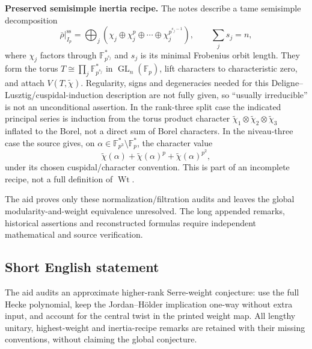 \documentclass[11pt]{article}
\newcommand{\F}{\mathbb{F}}
\begin{document}
\textbf{Preserved semisimple inertia recipe.} The notes describe a tame semisimple decomposition
\[
 \bar\rho|_{I_p}^{\mathrm{ss}}=
 \bigoplus_j(\chi_j\oplus\chi_j^p\oplus\cdots\oplus\chi_j^{p^{s_j-1}}),
 \qquad\sum_js_j=n,
\]
where \(\chi_j\) factors through \(\F_{p^{s_j}}^*\) and \(s_j\) is its minimal Frobenius orbit length. They form the torus \(T\cong\prod_j\F_{p^{s_j}}^*\) in \(\operatorname{GL}_n(\F_p)\), lift characters to characteristic zero, and attach \(V(T,\widetilde\chi)\). Regularity, signs and degeneracies needed for this Deligne--Lusztig/cuspidal-induction description are not fully given, so ``usually irreducible'' is not an unconditional assertion. In the rank-three split case the indicated principal series is induction from the torus product character \(\widetilde\chi_1\otimes\widetilde\chi_2\otimes\widetilde\chi_3\) inflated to the Borel, not a direct sum of Borel characters. In the niveau-three case the source gives, on \(\alpha\in\F_{p^3}^*\setminus\F_p^*\), the character value
\[
 \widetilde\chi(\alpha)+\widetilde\chi(\alpha)^p+
 \widetilde\chi(\alpha)^{p^2},
\]
under its chosen cuspidal/character convention. This is part of an incomplete recipe, not a full definition of \(\operatorname{Wt}\).

The aid proves only these normalization/filtration audits and leaves the global modularity-and-weight equivalence unresolved. The long appended remarks, historical assertions and reconstructed formulas require independent mathematical and source verification.
\subsection{Short English statement}
The aid audits an approximate higher-rank Serre-weight conjecture: use the full Hecke polynomial, keep the Jordan--H\"older implication one-way without extra input, and account for the central twist in the printed weight map. All lengthy unitary, highest-weight and inertia-recipe remarks are retained with their missing conventions, without claiming the global conjecture.
\end{document}
